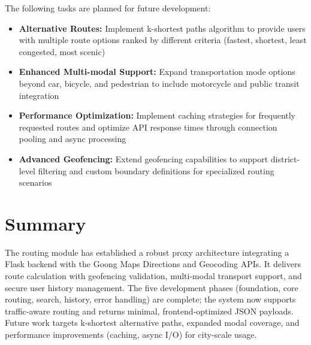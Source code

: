 The following tasks are planned for future development:

\begin{itemize}
    \item \textbf{Alternative Routes:} Implement k-shortest paths algorithm to provide users with multiple route options ranked by different criteria (fastest, shortest, least congested, most scenic)
    
    \item \textbf{Enhanced Multi-modal Support:} Expand transportation mode options beyond car, bicycle, and pedestrian to include motorcycle and public transit integration
                
    \item \textbf{Performance Optimization:} Implement caching strategies for frequently requested routes and optimize API response times through connection pooling and async processing
    
    \item \textbf{Advanced Geofencing:} Extend geofencing capabilities to support district-level filtering and custom boundary definitions for specialized routing scenarios
    
\end{itemize}

\section{Summary}

The routing module has established a robust proxy architecture integrating a Flask backend with the Goong Maps Directions and Geocoding APIs. It delivers route calculation with geofencing validation, multi‑modal transport support, and secure user history management. The five development phases (foundation, core routing, search, history, error handling) are complete; the system now supports traffic‑aware routing and returns minimal, frontend‑optimized JSON payloads. Future work targets k‑shortest alternative paths, expanded modal coverage, and performance improvements (caching, async I/O) for city-scale usage.
